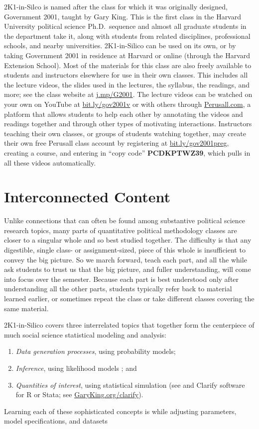 \documentclass[12pt]{article}
\theoremstyle{definition}
\begin{document}
2K1-in-Silco is named after the class for which it was originally designed, Government 2001, taught by Gary King. This is the first class in the Harvard University political science Ph.D.\ sequence and almost all graduate students in the department take it, along with students from related disciplines, professional schools, and nearby universities. 2K1-in-Silico can be used on its own, or by taking Government 2001 in residence at Harvard or online (through the Harvard Extension School).  Most of the materials for this class are also freely available to students and instructors elsewhere for use in their own classes. This includes all the lecture videos, the slides used in the lectures, the syllabus, the readings, and more; see the class website at \href{https://j.mp/G2001}{j.mp/G2001}. The lecture videos can be watched on your own on YouTube at \href{https://bit.ly/gov2001v}{bit.ly/gov2001v} or with others through \href{https://perusall.com}{Perusall.com}, a platform that allows students to help each other by annotating the videos and readings together and through other types of motivating interactions. Instructors teaching their own classes, or groups of students watching together, may create their own free Perusall class account by registering at \href{https://bit.ly/gov2001preg}{bit.ly/gov2001preg}, creating a course, and entering in ``copy code'' \textbf{PCDKPTWZ39}, which pulls in all these videos automatically.

\section{Interconnected Content}

Unlike connections that can often be found among substantive political science research topics, many parts of quantitative political methodology classes are closer to a singular whole and so best studied together. The difficulty is that any digestible, single class- or assignment-sized, piece of this whole is insufficient to convey the big picture. So we march forward, teach each part, and all the while ask students to trust us that the big picture, and fuller understanding, will come into focus over the semester. Because each part is best understood only after understanding all the other parts, students typically refer back to material learned earlier, or sometimes repeat the class or take different classes covering the same material.

2K1-in-Silico covers three interrelated topics that together form the centerpiece of much social science statistical modeling and analysis:
\begin{enumerate}\singlespacing
  \item \emph{Data generation processes}, using probability models;
  \item \emph{Inference}, using likelihood models \citep{King98}; and
  \item \emph{Quantities of interest}, using statistical simulation (see \citealt{KinTomWit00} and Clarify software for R or Stata; see \href{https://GaryKing.org/clarify}{GaryKing.org/clarify}).
  \end{enumerate}
Learning each of these sophisticated concepts is  while adjusting parameters, model specifications, and datasets 
\end{document}
